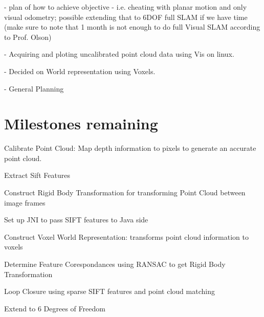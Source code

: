 \documentclass[12pt]{article}
\begin{document}
 - plan of how to achieve objective - i.e. cheating with planar motion and only visual odometry; possible extending that to 6DOF full SLAM if we have time (make sure to note that 1 month is not enough to do full Visual SLAM according to Prof. Olson)

- Acquiring and ploting uncalibrated point cloud data using Vis on linux.

- Decided on World representation using Voxels.

- General Planning

\section{Milestones remaining}
Calibrate Point Cloud: Map depth information to pixels to generate an accurate point cloud.

Extract Sift Features

Construct Rigid Body Transformation for transforming Point Cloud between image frames

Set up JNI to pass SIFT features to Java side

Construct Voxel World Representation: transforms point cloud information to voxels

Determine Feature Corespondances using RANSAC to get Rigid Body Transformation 

Loop Closure using sparse SIFT features and point cloud matching

Extend to 6 Degrees of Freedom
\end{document}
